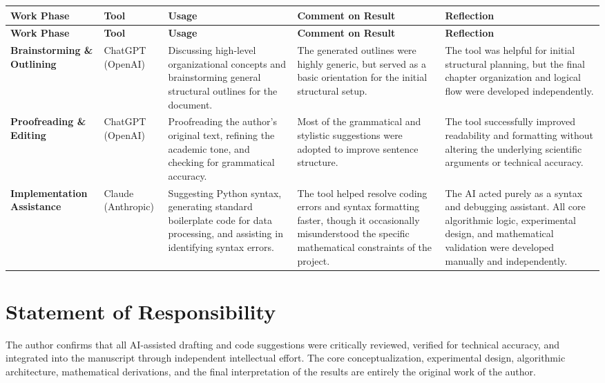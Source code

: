 \begingroup
\centering
\small
\renewcommand{\arraystretch}{1.5}
\begin{xltabular}{\textwidth}{|>{\raggedright\arraybackslash}p{2.8cm}|>{\raggedright\arraybackslash}p{2.2cm}|>{\raggedright\arraybackslash}X|>{\raggedright\arraybackslash}X|>{\raggedright\arraybackslash}X|}
\hline
\textbf{Work Phase} & \textbf{Tool} & \textbf{Usage} & \textbf{Comment on Result} & \textbf{Reflection} \\ \hline
\endfirsthead

\hline
\textbf{Work Phase} & \textbf{Tool} & \textbf{Usage} & \textbf{Comment on Result} & \textbf{Reflection} \\ \hline
\endhead

\textbf{Brainstorming \& Outlining} & ChatGPT (OpenAI) & Discussing high-level organizational concepts and brainstorming general structural outlines for the document. & The generated outlines were highly generic, but served as a basic orientation for the initial structural setup. & The tool was helpful for initial structural planning, but the final chapter organization and logical flow were developed independently. \\ \hline

\textbf{Proofreading \& Editing} & ChatGPT (OpenAI) & Proofreading the author's original text, refining the academic tone, and checking for grammatical accuracy. & Most of the grammatical and stylistic suggestions were adopted to improve sentence structure. & The tool successfully improved readability and formatting without altering the underlying scientific arguments or technical accuracy. \\ \hline

\textbf{Implementation Assistance} & Claude (Anthropic) & Suggesting Python syntax, generating standard boilerplate code for data processing, and assisting in identifying syntax errors. & The tool helped resolve coding errors and syntax formatting faster, though it occasionally misunderstood the specific mathematical constraints of the project. & The AI acted purely as a syntax and debugging assistant. All core algorithmic logic, experimental design, and mathematical validation were developed manually and independently. \\ \hline
\end{xltabular}
\endgroup

\section*{Statement of Responsibility}
The author confirms that all AI-assisted drafting and code suggestions were critically reviewed, verified for technical accuracy, and integrated into the manuscript through independent intellectual effort. The core conceptualization, experimental design, algorithmic architecture, mathematical derivations, and the final interpretation of the results are entirely the original work of the author.